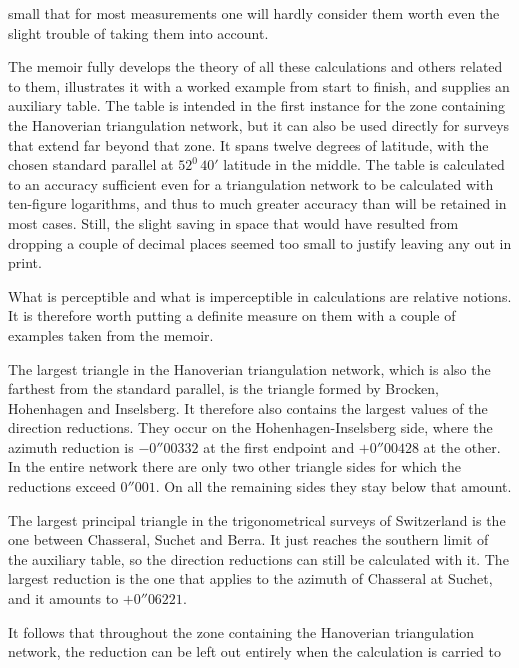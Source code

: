 %
small that for most measurements one will hardly consider them worth even the slight trouble of taking them into account.

The memoir fully develops the theory of all these calculations and others related to them, illustrates it with a worked example from start to finish, and supplies an auxiliary table. The table is intended in the first instance for the zone containing the Hanoverian triangulation network, but it can also be used directly for surveys that extend far beyond that zone. It spans twelve degrees of latitude, with the chosen standard parallel at \(52^0\,40'\) latitude in the middle. The table is calculated to an accuracy sufficient even for a triangulation network to be calculated with ten-figure logarithms, and thus to much greater accuracy than will be retained in most cases. Still, the slight saving in space that would have resulted from dropping a couple of decimal places seemed too small to justify leaving any out in print.

What is perceptible and what is imperceptible in calculations are relative notions. It is therefore worth putting a definite measure on them with a couple of examples taken from the memoir.

The largest triangle in the Hanoverian triangulation network, which is also the farthest from the standard parallel, is the triangle formed by Brocken, Hohenhagen and Inselsberg. It therefore also contains the largest values of the direction reductions. They occur on the Hohenhagen-Inselsberg side, where the azimuth reduction is \(-0''00332\) at the first endpoint and \(+0''00428\) at the other. In the entire network there are only two other triangle sides for which the reductions exceed \(0''001\). On all the remaining sides they stay below that amount.

The largest principal triangle in the trigonometrical surveys of Switzerland is the one between Chasseral, Suchet and Berra. It just reaches the southern limit of the auxiliary table, so the direction reductions can still be calculated with it. The largest reduction is the one that applies to the azimuth of Chasseral at Suchet, and it amounts to \(+0''06221\).

It follows that throughout the zone containing the Hanoverian triangulation network, the reduction can be left out entirely when the calculation is carried to
